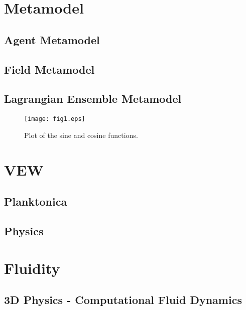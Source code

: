 \documentclass[12pt, a4paper]{report}
\begin{document}
\section{Metamodel}\label{sec:meta}

\subsection{Agent Metamodel}\label{subsec:agent-meta}

\subsection{Field Metamodel}\label{subsec:field-meta}

\subsection{Lagrangian Ensemble Metamodel}\label{subsec:le-meta}

\begin{figure}[t]
  \begin{center}
    \texttt{[image: fig1.eps]}
    \caption{\label{fig:sin_cos} Plot of the sine and cosine functions.}
  \end{center}
\end{figure}

\section{VEW}\label{sec:vew}

\subsection{Planktonica}\label{subsec:planktonica}

\subsection{Physics}\label{subsec:physics}

\section{Fluidity}\label{sec:fluidity}

\subsection{3D Physics - Computational Fluid Dynamics}\label{subsec:3d-phys}
\end{document}
